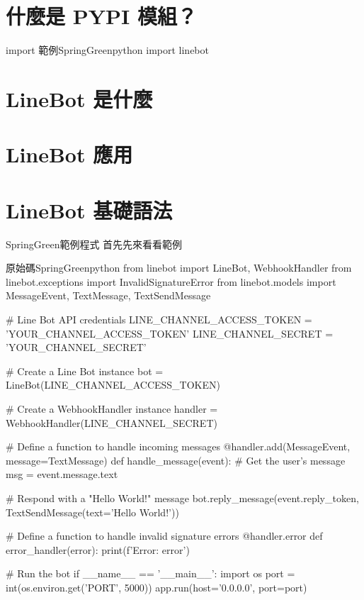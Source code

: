 \documentclass{article}
\begin{document}

\begin{large}

\section{什麼是 PYPI 模組？}
    \begin{mintbox}{import 範例}{SpringGreen}{python}
        import linebot
    \end{mintbox}
\section{LineBot 是什麼}
\section{LineBot 應用}
\section{LineBot 基礎語法}
\begin{boxpar}{SpringGreen}{範例程式}
首先先來看看範例
    \begin{mintbox}{原始碼}{SpringGreen}{python} %
    from linebot import LineBot, WebhookHandler
    from linebot.exceptions import InvalidSignatureError
    from linebot.models import MessageEvent, TextMessage, TextSendMessage

    # Line Bot API credentials
    LINE_CHANNEL_ACCESS_TOKEN = 'YOUR_CHANNEL_ACCESS_TOKEN'
    LINE_CHANNEL_SECRET = 'YOUR_CHANNEL_SECRET'

    # Create a Line Bot instance
    bot = LineBot(LINE_CHANNEL_ACCESS_TOKEN)

    # Create a WebhookHandler instance
    handler = WebhookHandler(LINE_CHANNEL_SECRET)

    # Define a function to handle incoming messages
    @handler.add(MessageEvent, message=TextMessage)
    def handle_message(event):
        # Get the user's message
        msg = event.message.text

        # Respond with a "Hello World!" message
        bot.reply_message(event.reply_token, TextSendMessage(text='Hello World!'))

    # Define a function to handle invalid signature errors
    @handler.error
    def error_handler(error):
        print(f'Error: {error}')

    # Run the bot
    if __name__ == '__main__':
        import os
        port = int(os.environ.get('PORT', 5000))
        app.run(host='0.0.0.0', port=port)
    \end{mintbox}
\end{boxpar}

\end{large}
\end{document}
